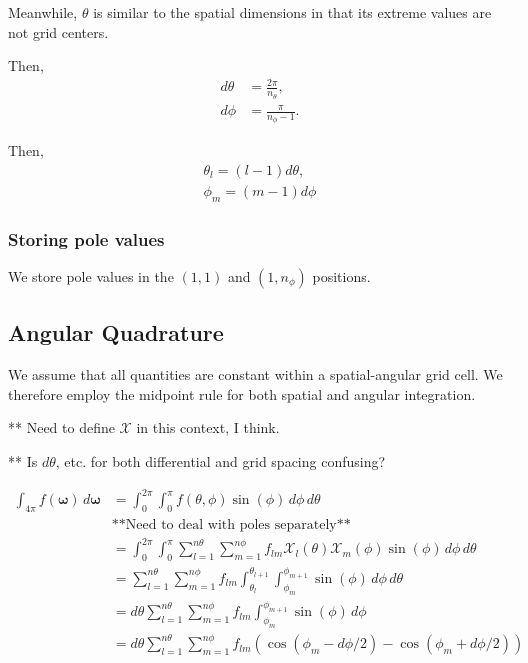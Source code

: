 \documentclass[10pt]{article}
\renewcommand\vec{\mathbf}
\begin{document}
Meanwhile, $\theta$ is similar to the spatial dimensions in that its extreme
values are not grid centers.

Then,
\begin{align}
  d\theta &= \frac{2\pi}{n_\theta}, \\
  d\phi &= \frac{\pi}{n_\phi-1}.
\end{align}

Then,
\begin{align}
  \theta_l = (l-1) d\theta, \\
  \phi_m = (m-1) d\phi
\end{align}

\subsubsection{Storing pole values}
We store pole values in the $(1,1)$ and $(1,n_\phi)$ positions.

\subsection{Angular Quadrature}
We assume that all quantities are constant within a spatial-angular grid cell.
We therefore employ the midpoint rule for both spatial and angular integration.

** Need to define $\mathcal{X}$ in this context, I think.

** Is $d\theta$, etc. for both differential and grid spacing confusing?

\begin{align}
  \int_{4\pi} f(\vec{\omega})\,d\vec{\omega} &= \int_0^{2\pi} \int_0^{\pi} f(\theta, \phi) \sin(\phi)\, d\phi\, d\theta \\
  &\mbox{**Need to deal with poles separately**} \\
                                             &= \int_0^{2\pi}\int_0^{\pi} \sum_{l=1}^{n\theta}\sum_{m=1}^{n\phi}f_{lm}\mathcal{X}_l(\theta) \mathcal{X}_m(\phi) \sin(\phi)\, d\phi\, d\theta \\
                                             &= \sum_{l=1}^{n\theta}\sum_{m=1}^{n\phi}f_{lm}\int_{\theta_l}^{\theta_{l+1}}\int_{\phi_m}^{\phi_{m+1}} \sin(\phi)\, d\phi\, d\theta \\
                                             &= d\theta\sum_{l=1}^{n\theta}\sum_{m=1}^{n\phi} f_{lm}\int_{\phi_m}^{\phi_{m+1}} \sin(\phi)\, d\phi \\
                                             &= d\theta\sum_{l=1}^{n\theta}\sum_{m=1}^{n\phi} f_{lm}\left( \cos(\phi_m-d\phi/2)-\cos(\phi_m+d\phi/2) \right) \\
\end{align}
\end{document}
